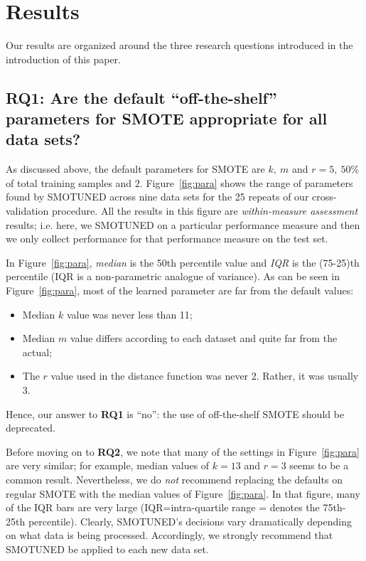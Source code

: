 \documentclass[10pt,conference]{IEEEtran}
\newcommand{\bi}{\begin{itemize}[leftmargin=0.4cm]}
\newcommand{\ei}{\end{itemize}}
\theoremstyle{break}
\theoremstyle{break}
\begin{document}
 
   

\section{Results}
\label{sect:results}

Our results are organized around the three
research questions introduced in the introduction
of this paper.

 \subsection{{\bf RQ1}: Are the default ``off-the-shelf'' parameters for SMOTE appropriate for all
 data sets?}
 
 
 As discussed above, the default parameters for
 SMOTE are $k,\ m$ and $r = 5,\ 50\%$ of total training samples and $2$.
  Figure~\ref{fig:para} shows the range of parameters
 found by SMOTUNED across  nine data sets for the 25 repeats of our cross-validation procedure.
 All the results in this figure are {\em within-measure assessment} results; i.e.
 here, we SMOTUNED  on a particular performance measure and then we only collect performance for that performance measure on the test set.
 
 
 In  Figure~\ref{fig:para}, {\em median} is the 50th percentile
 value and {\em IQR} is the (75-25)th percentile
 (IQR is a non-parametric analogue of variance).
 As can be seen in Figure~\ref{fig:para}, most of the learned parameter are far from the default values:
 \bi
 \item 
 Median $k$ value was never less than 11;
 \item
 Median $m$ value differs according to each dataset and quite far from the actual;
 \item
 The $r$ value used in the distance function was never 2. Rather, it was usually 3.
 \ei
 Hence,  our answer to {\bf RQ1} is ``no'': the use of off-the-shelf SMOTE should be deprecated. 
 
 Before moving on to {\bf RQ2}, we note that many of the settings in Figure~\ref{fig:para} are very similar; for example, median values of $k=13$ and $r=3$ seems to be a common
result.  Nevertheless, we do {\em not} recommend replacing
the defaults on regular SMOTE with the median values
of Figure~\ref{fig:para}. In that figure, many of the  IQR bars are
very large (IQR=intra-quartile range = denotes the
75th-25th percentile). Clearly, SMOTUNED's decisions vary dramatically
depending on what data  is being processed.  Accordingly,
we strongly recommend that SMOTUNED be applied to each new data set.
\end{document}
